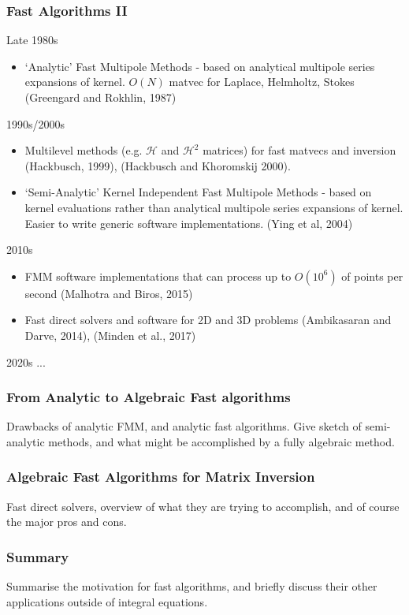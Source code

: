 \begin{frame}
    \frametitle{Fast Algorithms II}

    Late 1980s
    \begin{itemize}
        \item  `Analytic' Fast Multipole Methods - based on analytical multipole series expansions of kernel. $O(N)$ matvec for Laplace, Helmholtz, Stokes (Greengard and Rokhlin, 1987)
    \end{itemize}

    1990s/2000s
    \begin{itemize}
        \item  Multilevel methods (e.g. $\mathcal{H}$ and $\mathcal{H}^2$ matrices) for fast matvecs and inversion (Hackbusch, 1999), (Hackbusch and Khoromskij 2000).
        \item  `Semi-Analytic' Kernel Independent Fast Multipole Methods - based on kernel evaluations rather than analytical multipole series expansions of kernel. Easier to write generic software implementations. (Ying et al, 2004)
    \end{itemize}
    \end{frame}

    \begin{frame}

    2010s

    \begin{itemize}

        \item FMM software implementations that can process up to $O(10^6)$ of points per second (Malhotra and Biros, 2015)
        \item Fast direct solvers and software for 2D and 3D problems (Ambikasaran and Darve, 2014), (Minden et al., 2017)
    \end{itemize}

    2020s
    ...


\end{frame}


\begin{frame}
    \frametitle{From Analytic to Algebraic Fast algorithms}
    Drawbacks of analytic FMM, and analytic fast algorithms. Give sketch of semi-analytic methods, and what might be accomplished by a fully algebraic method.
\end{frame}


\begin{frame}
    \frametitle{Algebraic Fast Algorithms for Matrix Inversion}
    Fast direct solvers, overview of what they are trying to accomplish, and of course the major pros and cons.
\end{frame}


\begin{frame}
    \frametitle{Summary}
    Summarise the motivation for fast algorithms, and briefly discuss their other applications outside of integral equations.
\end{frame}

